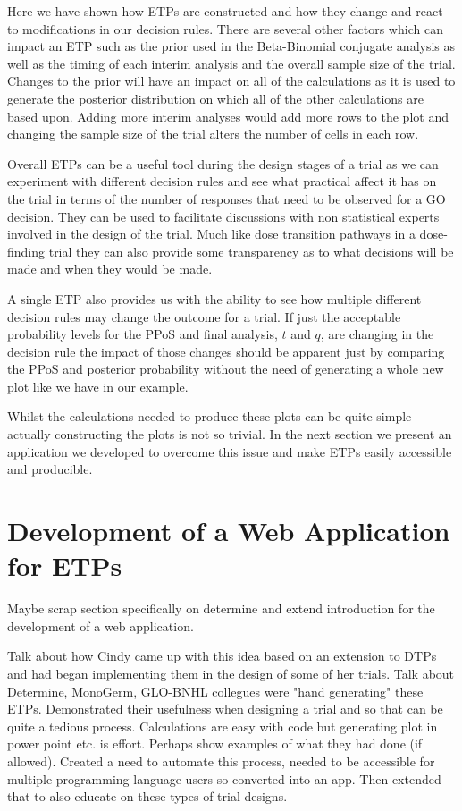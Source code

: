 \newpage

Here we have shown how ETPs are constructed and how they change and react to modifications in our decision rules. There are several other factors which can impact an ETP such as the prior used in the Beta-Binomial conjugate analysis as well as the timing of each interim analysis and the overall sample size of the trial. Changes to the prior will have an impact on all of the calculations as it is used to generate the posterior distribution on which all of the other calculations are based upon. Adding more interim analyses would add more rows to the plot and changing the sample size of the trial alters the number of cells in each row. 

Overall ETPs can be a useful tool during the design stages of a trial as we can experiment with different decision rules and see what practical affect it has on the trial in terms of the number of responses that need to be observed for a GO decision. They can be used to facilitate discussions with non statistical experts involved in the design of the trial. Much like dose transition pathways in a dose-finding trial they can also provide some transparency as to what decisions will be made and when they would be made. 

A single ETP also provides us with the ability to see how multiple different decision rules may change the outcome for a trial. If just the acceptable probability levels for the PPoS and final analysis, $t$ and $q$, are changing in the decision rule the impact of those changes should be apparent just by comparing the PPoS and posterior probability without the need of generating a whole new plot like we have in our example.

Whilst the calculations needed to produce these plots can be quite simple actually constructing the plots is not so trivial. In the next section we present an application we developed to overcome this issue and make ETPs easily accessible and producible. 



\section{Development of a Web Application for ETPs}

Maybe scrap section specifically on determine and extend introduction for the development of a web application. 

Talk about how Cindy came up with this idea based on an extension to DTPs and had began implementing them in the design of some of her trials. Talk about Determine, MonoGerm, GLO-BNHL collegues were "hand generating" these ETPs. Demonstrated their usefulness when designing a trial and so that can be quite a tedious process. Calculations are easy with code but generating plot in power point etc. is effort. Perhaps show examples of what they had done (if allowed). Created a need to automate this process, needed to be accessible for multiple programming language users so converted into an app. Then extended that to also educate on these types of trial designs. 